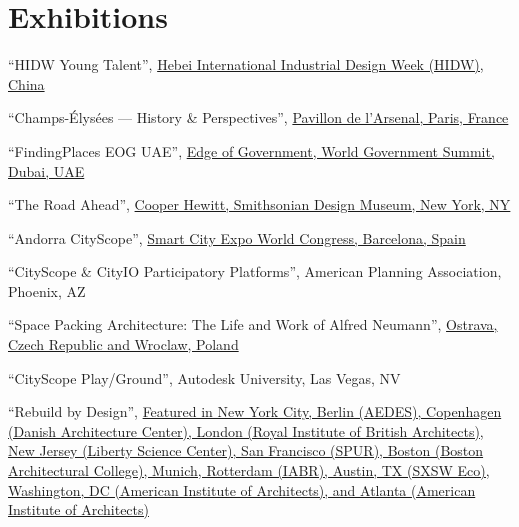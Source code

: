 \section*{Exhibitions}

\begin{tablist}

    \item[2020] \tab \enquote{HIDW Young Talent},
    \href{http://hidw-en.aty.cn/activity/Default.aspx?id=10000069}{Hebei International Industrial Design Week (HIDW), China}

    \item[2020] \tab \enquote{Champs-Élysées --- History \& Perspectives},
    \href{https://www.pavillon-arsenal.com/en/expositions/11463-champs-elysees.html}{Pavillon de l'Arsenal, Paris, France}

    \item[2019] \tab \enquote{FindingPlaces EOG UAE},
    \href{https://edge.worldgovernmentsummit.org}{Edge of Government, World Government Summit, Dubai, UAE}

    \item[2018] \tab \enquote{The Road Ahead},
    \href{https://www.cooperhewitt.org/channel/road-ahead/}{Cooper Hewitt, Smithsonian Design Museum, New York, NY}

    \item[2016] \tab \enquote{Andorra CityScope},
    \href{https://www.actua.ad/en/actualitat/andorran-projects-attract-international-attention-smart-city-expo-world-congress}{Smart City Expo World Congress, Barcelona, Spain}

    \item[2016] \tab \enquote{CityScope \& CityIO Participatory Platforms},
    American Planning Association, Phoenix, AZ

    \item[2015] \tab \enquote{Space Packing Architecture: The Life and Work of Alfred Neumann},
    \href{https://www.archdaily.com/633053/space-packing-architecture-the-life-and-work-of-alfred-neumann?ad_medium=gallery}{Ostrava, Czech Republic and Wroclaw, Poland}

    \item[2014] \tab \enquote{CityScope Play/Ground},
    Autodesk University, Las Vegas, NV

    \item[2014] \tab \enquote{Rebuild by Design},
    \href{https://rebuildbydesign.org/news-and-events/exhibitions/rebuild-by-design-hurricane-sandy-design-competition/}{Featured in New York City, Berlin (AEDES), Copenhagen (Danish Architecture Center), London (Royal Institute of British Architects), New Jersey (Liberty Science Center), San Francisco (SPUR), Boston (Boston Architectural College), Munich, Rotterdam (IABR), Austin, TX (SXSW Eco), Washington, DC (American Institute of Architects), and Atlanta (American Institute of Architects)}


\end{tablist}
